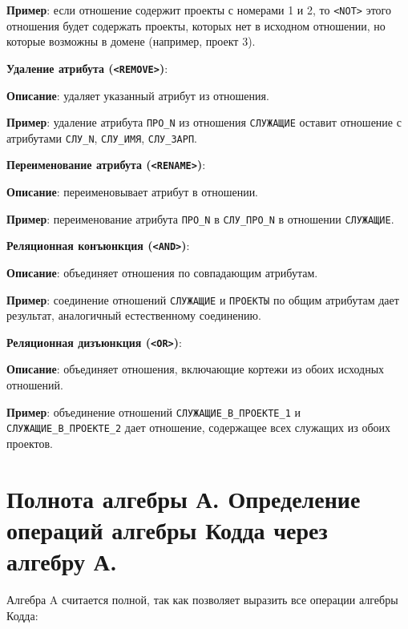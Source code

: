 \documentclass[a4paper,12pt]{article}
\begin{document}
\textbf{Пример}: если отношение содержит проекты с номерами 1 и 2, то \texttt{<NOT>} этого отношения будет содержать проекты, которых нет в исходном отношении, но которые возможны в домене (например, проект 3).

\textbf{Удаление атрибута (\texttt{<REMOVE>})}:

\textbf{Описание}: удаляет указанный атрибут из отношения.

\textbf{Пример}: удаление атрибута \texttt{ПРО\_N} из отношения \texttt{СЛУЖАЩИЕ} оставит отношение с атрибутами \texttt{СЛУ\_N}, \texttt{СЛУ\_ИМЯ}, \texttt{СЛУ\_ЗАРП}.

\textbf{Переименование атрибута (\texttt{<RENAME>})}:

\textbf{Описание}: переименовывает атрибут в отношении.

\textbf{Пример}: переименование атрибута \texttt{ПРО\_N} в \texttt{СЛУ\_ПРО\_N} в отношении \texttt{СЛУЖАЩИЕ}.

\textbf{Реляционная конъюнкция (\texttt{<AND>})}:

\textbf{Описание}: объединяет отношения по совпадающим атрибутам.

\textbf{Пример}: соединение отношений \texttt{СЛУЖАЩИЕ} и \texttt{ПРОЕКТЫ} по общим атрибутам дает результат, аналогичный естественному соединению.

\textbf{Реляционная дизъюнкция (\texttt{<OR>})}:

\textbf{Описание}: объединяет отношения, включающие кортежи из обоих исходных отношений.

\textbf{Пример}: объединение отношений \texttt{СЛУЖАЩИЕ\_В\_ПРОЕКТЕ\_1} и \texttt{СЛУЖАЩИЕ\_В\_ПРОЕКТЕ\_2} дает отношение, содержащее всех служащих из обоих проектов.
 
\section{Полнота алгебры А. Определение операций алгебры Кодда через алгебру А.}

Алгебра A считается полной, так как позволяет выразить все операции алгебры Кодда:
\end{document}
